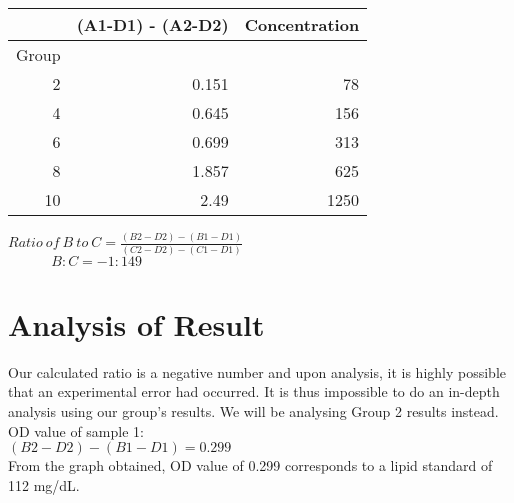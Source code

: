 \documentclass[11.5pt,a4paper]{IEEEtran}
\begin{document}
    \begin{table}[H]
    	\centering
    	\label{my-label}
    	\begin{tabular}{|r|r|r|}
    		\hline
    		\multicolumn{1}{|l|}{}      & \multicolumn{1}{l|}{(A1-D1) - (A2-D2)} & \multicolumn{1}{l|}{Concentration} \\ \hline
    		\multicolumn{1}{|c|}{Group} &                                        &                                    \\ \hline
    		2                           & 0.151                                  & 78                                 \\ \hline
    		4                           & 0.645                                  & 156                                \\ \hline
    		6                           & 0.699                                  & 313                                \\ \hline
    		8                           & 1.857                                  & 625                                \\ \hline
    		10                          & 2.49                                   & 1250                               \\ \hline
    	\end{tabular}
    \end{table}
    $Ratio \ of \ B \ to \ C = \frac{(B2-D2)-(B1-D1)}{(C2-D2)-(C1-D1)}$ \\
    
    $\ \ \ \ \ \ \ \ \ \ \ \ \ \ B : C = -1 : 149$                       
    \section{Analysis of Result}
    Our calculated ratio is a negative number and upon analysis, it is highly possible that an experimental error had occurred. It is thus impossible to do an in-depth analysis using our group's results. We will be analysing Group 2 results instead. \\
    
    OD value of sample 1: \\
    
    $(B2-D2)-(B1-D1) = 0.299$ \\
    
    From the graph obtained, OD value of 0.299 corresponds to a lipid standard of 112 mg/dL. \\
    
\end{document}

